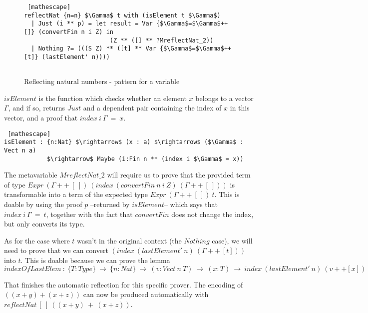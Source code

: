  \begin{figure}[H]
\figrule
\begin{center}
\begin{lstlisting} [mathescape]
reflectNat {n=n} $\Gamma$ t with (isElement t $\Gamma$)
  | Just (i ** p) = let result = Var {$\Gamma$=$\Gamma$++[]} (convertFin n i Z) in
                        (Z ** ([] ** ?MreflectNat_2))
  | Nothing ?= (((S Z) ** ([t] ** Var {$\Gamma$=$\Gamma$++[t]} (lastElement' n))))  
            
\end{lstlisting}
\end{center}
\caption{Reflecting natural numbers - pattern for a variable}
\label{reflectNat_pattern3}
\figrule
\end{figure}

$isElement$ is the function which checks whether an element $x$ belongs to a vector $\Gamma$, and if so, returns $Just$ and a dependent pair containing the index of $x$ in this vector, and a proof that $index\ i\ \Gamma\ =\ x$.


\begin{lstlisting} [mathescape]
isElement : {n:Nat} $\rightarrow$ (x : a) $\rightarrow$ ($\Gamma$ : Vect n a) 
            $\rightarrow$ Maybe (i:Fin n ** (index i $\Gamma$ = x))
\end{lstlisting}


The metavariable $MreflectNat\_2$ will require us to prove that the provided term of type $Expr\ (\Gamma ++\ [\ ])\ (index\ (convertFin\ n\ i\ Z)\ (\Gamma ++\ [\ ]))$ is transformable into a term of the expected type $Expr\ (\Gamma ++\ [\ ])\ t$. This is doable by using the proof $p$ --returned by $isElement$-- which says that $index\ i\ \Gamma\ =\ t$, together with the fact that $convertFin$ does not change the index, but only converts its type.

As for the case where $t$ wasn't in the original context (the $Nothing$ case), we will need to prove that we can convert $(index\ (lastElement'\ n)\ (\Gamma ++\ [t]))$ into $t$. This is doable because we can prove the lemma $indexOfLastElem\ :\ \{T:Type\}\ \rightarrow\ \{n:Nat\}\ \rightarrow\ (v:Vect\ n\ T)\ \rightarrow\ (x:T)\ \rightarrow\ index\ (lastElement'\ n)\ (v++[x])\ =\ x$ 	

            
That finishes the automatic reflection for this specific prover. The encoding of $((x+y) + (x+z))$ can now be produced automatically with $reflectNat\ [\ ]\ ((x+y)\ +\ (x+z))$.
            

            
